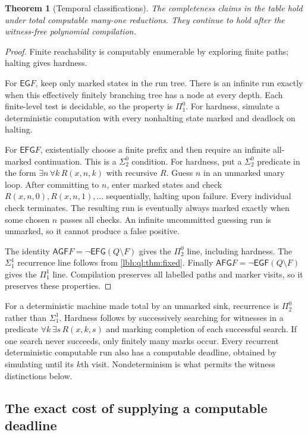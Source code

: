 \documentclass[11pt,letterpaper]{article}
\newtheorem{theorem}{Theorem}[section]
\theoremstyle{definition}
\theoremstyle{remark}
\newcommand{\EG}{\mathsf{EG}}
\newcommand{\EGF}{\mathsf{EGF}}
\newcommand{\EFG}{\mathsf{EFG}}
\newcommand{\AGF}{\mathsf{AGF}}
\newcommand{\AFG}{\mathsf{AFG}}
\newcommand{\1}{\mathbf 1}
\newcommand{\srctag}[1]{\texorpdfstring{\hspace{0.4em}{\normalfont\small\color{accent}[source #1]}}{ [source #1]}}
\begin{document}
\begin{theorem}[Temporal classifications]\label{lbh:ql:thm:temporal}
The completeness claims in the table hold under total computable many-one
reductions. They continue to hold after the witness-free polynomial
compilation.
\end{theorem}
\begin{proof}
Finite reachability is computably enumerable by exploring finite paths;
halting gives hardness.

For $\EG F$, keep only marked states in the run tree. There is an infinite
run exactly when this effectively finitely branching tree has a node at every
depth. Each finite-level test is decidable, so the property is $\Pi^0_1$.
For hardness, simulate a deterministic computation with every nonhalting state
marked and deadlock on halting.

For $\EFG F$, existentially choose a finite prefix and then require an infinite
all-marked continuation. This is a $\Sigma^0_2$ condition. For hardness, put
a $\Sigma^0_2$ predicate in the form
$\exists n\,\forall k\,R(x,n,k)$ with recursive $R$. Guess $n$ in an
unmarked unary loop. After committing to $n$, enter marked states and check
$R(x,n,0),R(x,n,1),\ldots$ sequentially, halting upon failure. Every individual
check terminates. The resulting run is eventually always marked exactly when
some chosen $n$ passes all checks. An infinite uncommitted guessing run is
unmarked, so it cannot produce a false positive.

The identity $\AGF F=\neg\EFG(Q\setminus F)$ gives the $\Pi^0_2$ line,
including hardness. The $\Sigma^1_1$ recurrence line follows from
\cref{lbh:ql:thm:fixed}. Finally
$\AFG F=\neg\EGF(Q\setminus F)$ gives the $\Pi^1_1$ line. Compilation
preserves all labelled paths and marker visits, so it preserves these
properties.
\end{proof}
For a deterministic machine made total by an unmarked sink, recurrence is
$\Pi^0_2$ rather than $\Sigma^1_1$. Hardness follows by successively searching
for witnesses in a predicate $\forall k\,\exists s\,R(x,k,s)$ and marking
completion of each successful search. If one search never succeeds, only
finitely many marks occur. Every recurrent deterministic computable run also
has a computable deadline, obtained by simulating until its $k$th visit.
Nondeterminism is what permits the witness distinctions below.
\subsection{The exact cost of supplying a computable deadline\srctag{11}}
\label{lbh:ql:sec:sigma3}
\end{document}
